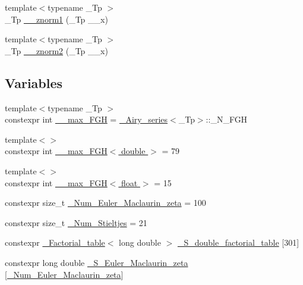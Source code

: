 \begin{DoxyCompactItemize}
\item 
{\footnotesize template$<$typename \+\_\+\+Tp $>$ }\\\+\_\+\+Tp \hyperlink{namespacestd_1_1____detail_a6827b123253cc6a19947406339738bd7}{\+\_\+\+\_\+znorm1} (\+\_\+\+Tp \+\_\+\+\_\+x)
\item 
{\footnotesize template$<$typename \+\_\+\+Tp $>$ }\\\+\_\+\+Tp \hyperlink{namespacestd_1_1____detail_adf930b70ca943c6810ac7d2ea78d2cc3}{\+\_\+\+\_\+znorm2} (\+\_\+\+Tp \+\_\+\+\_\+x)
\end{DoxyCompactItemize}
\subsection*{Variables}
\begin{DoxyCompactItemize}
\item 
{\footnotesize template$<$typename \+\_\+\+Tp $>$ }\\constexpr int \hyperlink{namespacestd_1_1____detail_ae3ef7007b55cd83fa162820c809a2995}{\+\_\+\+\_\+max\+\_\+\+F\+GH} = \hyperlink{classstd_1_1____detail_1_1__Airy__series}{\+\_\+\+Airy\+\_\+series}$<$\+\_\+\+Tp$>$\+::\+\_\+\+N\+\_\+\+F\+GH
\item 
{\footnotesize template$<$$>$ }\\constexpr int \hyperlink{namespacestd_1_1____detail_ac945c3d1897eb356e75d379f67367a4b}{\+\_\+\+\_\+max\+\_\+\+F\+G\+H$<$ double $>$} = 79
\item 
{\footnotesize template$<$$>$ }\\constexpr int \hyperlink{namespacestd_1_1____detail_a67195934ce49105fd7b765e669a5a2a0}{\+\_\+\+\_\+max\+\_\+\+F\+G\+H$<$ float $>$} = 15
\item 
constexpr size\+\_\+t \hyperlink{namespacestd_1_1____detail_ab27e687e1052be7a72de187e0dead124}{\+\_\+\+Num\+\_\+\+Euler\+\_\+\+Maclaurin\+\_\+zeta} = 100
\item 
constexpr size\+\_\+t \hyperlink{namespacestd_1_1____detail_a20c3b4334b0ffa9a5da21768d7830894}{\+\_\+\+Num\+\_\+\+Stieltjes} = 21
\item 
constexpr \hyperlink{structstd_1_1____detail_1_1__Factorial__table}{\+\_\+\+Factorial\+\_\+table}$<$ long double $>$ \hyperlink{namespacestd_1_1____detail_a6d1131fefdb30b2746c76ff801bdc833}{\+\_\+\+S\+\_\+double\+\_\+factorial\+\_\+table} \mbox{[}301\mbox{]}
\item 
constexpr long double \hyperlink{namespacestd_1_1____detail_acd941b49595dd03e93c88107ad2f68c2}{\+\_\+\+S\+\_\+\+Euler\+\_\+\+Maclaurin\+\_\+zeta} \mbox{[}\hyperlink{namespacestd_1_1____detail_ab27e687e1052be7a72de187e0dead124}{\+\_\+\+Num\+\_\+\+Euler\+\_\+\+Maclaurin\+\_\+zeta}\mbox{]}

\end{DoxyCompactItemize}

